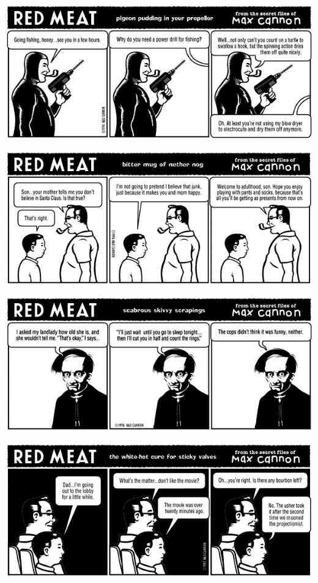 \documentclass[a4paper,twoside,11pt]{article}
\begin{document}
\includegraphics[width=\textwidth]{redmeat_1997-03-17.png}



\includegraphics[width=\textwidth]{redmeat_1997-03-24.png}



\includegraphics[width=\textwidth]{redmeat_1997-03-31.png}



\includegraphics[width=\textwidth]{redmeat_1997-04-07.png}
\end{document}
